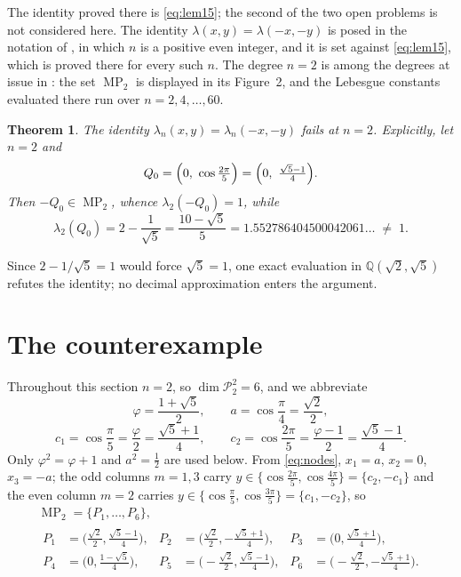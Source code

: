 \documentclass[11pt]{amsart}
\newtheorem{theorem}{Theorem}
\DeclareMathOperator{\MP}{MP}
\newcommand{\ph}{\varphi}
\begin{document}
\noindent
The identity proved there is \eqref{eq:lem15}; the second of the two open
problems is not considered here. The identity
$\lambda(x,y)=\lambda(-x,-y)$ is posed in the notation of \cite{BBD}, in which
$n$ is a positive even integer, and it is set against \eqref{eq:lem15}, which is
proved there for every such $n$. The degree $n=2$ is among the degrees at issue
in \cite{BBD}: the set $\MP_2$ is displayed in its Figure~2, and the Lebesgue
constants evaluated there run over $n=2,4,\dots,60$.

\begin{theorem}\label{thm:main}
The identity $\lambda_n(x,y)=\lambda_n(-x,-y)$ fails at $n=2$. Explicitly, let
$n=2$ and
\[
  Q_0=\Bigl(0,\ \cos\tfrac{2\pi}5\Bigr)=\Bigl(0,\ \tfrac{\sqrt5-1}4\Bigr).
\]
Then $-Q_0\in\MP_2$, whence $\lambda_2(-Q_0)=1$, while
\[
  \lambda_2(Q_0)=2-\frac1{\sqrt5}=\frac{10-\sqrt5}5
  =1.552786404500042061\ldots\;\ne\;1 .
\]
\end{theorem}

Since $2-1/\sqrt5=1$ would force $\sqrt5=1$, one exact evaluation in
$\mathbb Q(\sqrt2,\sqrt5)$ refutes the identity; no decimal approximation enters
the argument.

\section{The counterexample}

Throughout this section $n=2$, so $\dim\mathcal P_2^2=6$, and we abbreviate
\[
  \ph=\frac{1+\sqrt5}2,\qquad
  a=\cos\frac\pi4=\frac{\sqrt2}2,
\]
\[
  c_1=\cos\frac\pi5=\frac{\ph}2=\frac{\sqrt5+1}4,\qquad
  c_2=\cos\frac{2\pi}5=\frac{\ph-1}2=\frac{\sqrt5-1}4 .
\]
Only $\ph^2=\ph+1$ and $a^2=\frac12$ are used below. From \eqref{eq:nodes},
$x_1=a$, $x_2=0$, $x_3=-a$; the odd columns $m=1,3$ carry
$y\in\{\cos\frac{2\pi}5,\cos\frac{4\pi}5\}=\{c_2,-c_1\}$ and the even column
$m=2$ carries $y\in\{\cos\frac{\pi}5,\cos\frac{3\pi}5\}=\{c_1,-c_2\}$, so
\begin{equation}\label{eq:MP2}
\begin{gathered}
  \MP_2=\{P_1,\dots,P_6\}, \\
  \begin{aligned}
   P_1&=\bigl(\tfrac{\sqrt2}2,\tfrac{\sqrt5-1}4\bigr), &
   P_2&=\bigl(\tfrac{\sqrt2}2,-\tfrac{\sqrt5+1}4\bigr), &
   P_3&=\bigl(0,\tfrac{\sqrt5+1}4\bigr), \\
   P_4&=\bigl(0,\tfrac{1-\sqrt5}4\bigr), &
   P_5&=\bigl(-\tfrac{\sqrt2}2,\tfrac{\sqrt5-1}4\bigr), &
   P_6&=\bigl(-\tfrac{\sqrt2}2,-\tfrac{\sqrt5+1}4\bigr).
  \end{aligned}
\end{gathered}
\end{equation}
\end{document}
